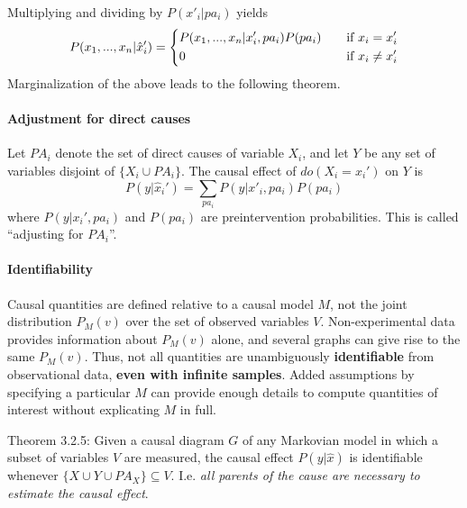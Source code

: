 \documentclass[11pt]{article}
\numberwithin{equation}{section}
\begin{document}
Multiplying and dividing by $P(x'_i|pa_i)$ yields
\begin{equation}
P(x_1,...,x_n|\hat{x}'_i)=\begin{dcases}
P(x_1,...,x_n|x_i',pa_i)P(pa_i) \quad &\text{if}\ x_i = x_i'\\
0 &\text{if}\ x_i \neq x_i'
\end{dcases}
\end{equation}
Marginalization of the above leads to the following theorem.

\paragraph{Adjustment for direct causes} 
Let $PA_i$ denote the set of direct causes of variable $X_i$, and let $Y$ be any set of variables disjoint of $\{X_i \cup PA_i \}$. The causal effect of $do(X_i=x_i')$ on $Y$ is
\begin{equation}
P(y|\hat{x}_i') = \sum_{pa_i} P(y | x'_i, pa_i) P(pa_i)
\end{equation}
where $P(y|x_i', pa_i)$ and $P(pa_i)$ are preintervention probabilities. This is called ``adjusting for $PA_i$''.


\paragraph{Identifiability}
Causal quantities are defined relative to a causal model $M$, not the joint distribution $P_M(v)$ over the set of observed variables $V$. Non-experimental data provides information about $P_M(v)$ alone, and several graphs can give rise to the same $P_M(v)$. Thus, not all quantities are unambiguously \textbf{identifiable} from observational data, \textbf{even with infinite samples}. Added assumptions by specifying a particular $M$ can provide enough details to compute quantities of interest without explicating $M$ in full.

Theorem 3.2.5: Given a causal diagram $G$ of any Markovian model in which a subset of variables $V$ are measured, the causal effect $P(y|\hat{x})$ is identifiable whenever $\{X \cup Y \cup PA_X\} \subseteq V$. I.e. \textit{all parents of the cause are necessary to estimate the causal effect}.
\end{document}
